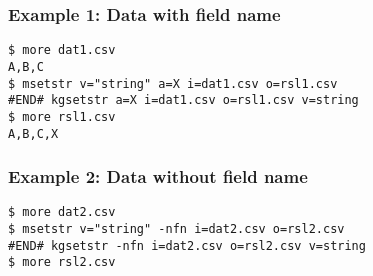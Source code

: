\subsubsection*{Example 1: Data with field name}



\begin{Verbatim}[baselinestretch=0.7,frame=single]
$ more dat1.csv
A,B,C
$ msetstr v="string" a=X i=dat1.csv o=rsl1.csv
#END# kgsetstr a=X i=dat1.csv o=rsl1.csv v=string
$ more rsl1.csv
A,B,C,X
\end{Verbatim}
\subsubsection*{Example 2: Data without field name}



\begin{Verbatim}[baselinestretch=0.7,frame=single]
$ more dat2.csv
$ msetstr v="string" -nfn i=dat2.csv o=rsl2.csv
#END# kgsetstr -nfn i=dat2.csv o=rsl2.csv v=string
$ more rsl2.csv
\end{Verbatim}
